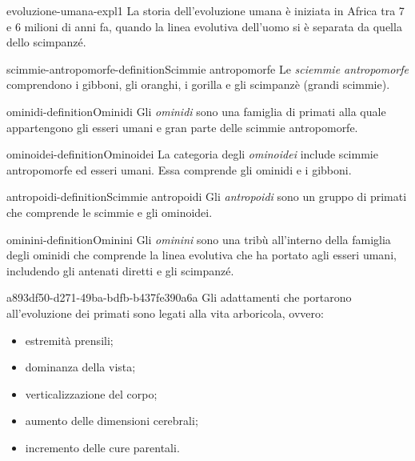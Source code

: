 \documentclass[preview]{standalone}
\begin{document}
\begin{snippet}{evoluzione-umana-expl1}
    La storia dell'evoluzione umana è iniziata in Africa tra
    7 e 6 milioni di anni fa, quando la linea evolutiva dell'uomo
    si è separata da quella dello scimpanzé. 
\end{snippet}

\begin{snippetdefinition}{scimmie-antropomorfe-definition}{Scimmie antropomorfe}
    Le \textit{sciemmie antropomorfe} comprendono i gibboni, gli oranghi, i gorilla
    e gli scimpanzè (grandi scimmie).
\end{snippetdefinition}

\begin{snippetdefinition}{ominidi-definition}{Ominidi}
    Gli \textit{ominidi} sono una famiglia di primati
    alla quale appartengono gli esseri umani
    e gran parte delle scimmie antropomorfe. %
\end{snippetdefinition}

\begin{snippetdefinition}{ominoidei-definition}{Ominoidei}
    La categoria degli \textit{ominoidei} include scimmie antropomorfe ed esseri umani.
    Essa comprende gli ominidi e i gibboni.
\end{snippetdefinition}

\begin{snippetdefinition}{antropoidi-definition}{Scimmie antropoidi}
    Gli \textit{antropoidi} sono un gruppo di primati che comprende le
    scimmie e gli ominoidei. 
\end{snippetdefinition}

\begin{snippetdefinition}{ominini-definition}{Ominini}
    Gli \textit{ominini} sono una tribù all'interno della famiglia degli ominidi
    che comprende la linea evolutiva che ha portato agli esseri umani,
    includendo gli antenati diretti e gli scimpanzé.
\end{snippetdefinition}


\begin{snippet}{a893df50-d271-49ba-bdfb-b437fe390a6a}
    Gli adattamenti che portarono all'evoluzione dei primati sono legati alla
    vita arboricola, ovvero:
    \begin{itemize}
        \item estremità prensili;
        \item dominanza della vista;
        \item verticalizzazione del corpo;
        \item aumento delle dimensioni cerebrali;
        \item incremento delle cure parentali.
    \end{itemize}
\end{snippet}
\end{document}
